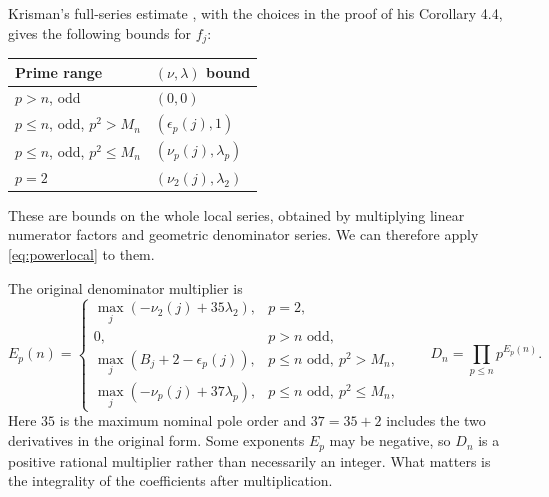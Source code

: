 \documentclass[11pt]{article}
\begin{document}
Krisman's full-series estimate \cite[Lemma 4.3]{krisman}, with the choices
in the proof of his Corollary 4.4, gives the following bounds for $f_j$:
\begin{center}
\begin{tabular}{ll}\toprule
Prime range & $(\nu,\lambda)$ bound\\\midrule
$p>n$, odd & $(0,0)$\\
$p\le n$, odd, $p^2>M_n$ & $(\epsilon_p(j),1)$\\
$p\le n$, odd, $p^2\le M_n$ & $(\nu_p(j),\lambda_p)$\\
$p=2$ & $(\nu_2(j),\lambda_2)$\\\bottomrule
\end{tabular}
\end{center}
These are bounds on the whole local series, obtained by multiplying
linear numerator factors and geometric denominator series. We can
therefore apply \eqref{eq:powerlocal} to them.

The original denominator multiplier is
\begin{equation}\label{eq:E}
 E_p(n)=\begin{cases}
 \max_j(-\nu_2(j)+35\lambda_2),&p=2,\\
 0,&p>n\text{ odd},\\
 \max_j(B_j+2-\epsilon_p(j)),&p\le n\text{ odd},\ p^2>M_n,\\
 \max_j(-\nu_p(j)+37\lambda_p),&p\le n\text{ odd},\ p^2\le M_n,
 \end{cases}
 \qquad D_n=\prod_{p\le n}p^{E_p(n)}.
\end{equation}
Here $35$ is the maximum nominal pole order and $37=35+2$ includes
the two derivatives in the original form. Some exponents $E_p$ may be
negative, so $D_n$ is a positive rational multiplier rather than
necessarily an integer. What matters is the integrality of the
coefficients after multiplication.
\end{document}
